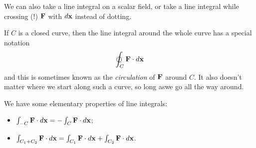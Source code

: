 \documentclass{../template/note}
\begin{document}
    \begin{remark*}
        We can also take a line integral on a scalar field, or take a line integral while crossing (!) \(\V F\) with \(d \V x\) instead of dotting.
    \end{remark*}
    
    If \(C\) is a closed curve, then the line integral around the whole curve has a special notation
    \begin{align*}
        \oint_C \V F \cdot d \V x
    \end{align*}
    and this is sometimes known as the \emph{circulation} of \(\V F\) around \(C\). It also doesn't matter where we start along such a curve, so long aswe go all the way around.

    We have some elementary properties of line integrals:
    \begin{itemize}
        \item \(\int_{-C} \V F \cdot d \V x = -\int_C \V F \cdot d \V x\);
        \item \(\int_{C_1+C_2} \V F \cdot d \V x = \int_{C_1} \V F \cdot d \V x + \int_{C_2} \V F \cdot d \V x\).
    \end{itemize}
    
\end{document}
